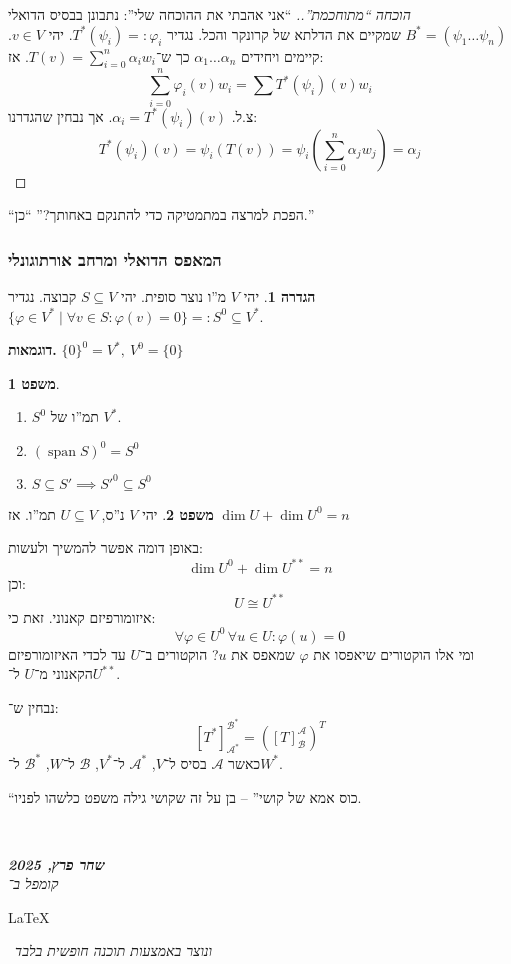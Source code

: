 \documentclass[a4paper]{article}
\newcommand\en[1] {\begin{otherlanguage}{english}#1\end{otherlanguage}}
\newcommand\ndoc  {\dotfill \\ \vfil {\begin{center}
			{\textbf{\textit{שחר פרץ, 2025}} \\
				\scriptsize \textit{קומפל ב־}\en{\LaTeX}\,\textit{ ונוצר באמצעות תוכנה חופשית בלבד}}
	\end{center}} \vfil	}
\newcommand\ac    {\mathcal{A}}
\newcommand\bc    {\mathcal{B}}
\newcommand\sumni     {\sum_{i = 0}^{n}}
\DeclareMathOperator{\Sp}      {span}
\newcommand\co        {\colon}
\newcommand\ag        {\alpha}
\newcommand\cl [1]    {\left ( #1 \right )}
\renewcommand\phi     {\varphi}
\theoremstyle{definition}
\newtheorem{Theorem}{\color{myblue}משפט}
\newtheorem{Definition}{\color{mygreen}הגדרה}
\newcommand\theo  [1] {\begin{Theorem}#1\end{Theorem}}
\newcommand\defi  [1] {\begin{Definition}#1\end{Definition}}
\begin{document}
	\begin{proof}[הוכחה ``מתוחכמת''.]
		``אני אהבתי את ההוכחה שלי'': נתבונן בבסיס הדואלי $B^* = (\psi_1 \dots \psi_n)$ שמקיים את הדלתא של קרונקר והכל. 
		נגדיר $T^*(\psi_i) =: \phi_i$. יהי $v \in V$. קיימים ויחידים $\ag_1 \dots \ag_n$ כך ש־$T(v) = \sumni \ag_i w_i$. אז: 
		\[ \sumni \phi_i(v)w_i = \sum T^*(\psi_i)(v) w_i \]
		צ.ל. $\ag_i = T^*(\psi_i)(v)$. אך נבחין שהגדרנו: 
		\[ T^*(\psi_i)(v) = \psi_i(T(v)) = \psi_i\cl{\sumni \ag_j w_j} = \ag_j \]
		
	\end{proof}
	
	``הפכת למרצה במתמטיקה כדי להתנקם באחותך?'' ``כן.''
	
	\subsubsection{המאפס הדואלי ומרחב אורתוגונלי}
	\defi{יהי $V$ מ''ו נוצר סופית. יהי $S \subseteq V$ קבוצה. נגדיר $\{\phi \in V^* \mid \forall v \in S \co \phi(v) = 0\} =: S^0 \subseteq V^*$. }
	
	\textbf{דוגמאות. } \hfil $\{0\}^0 = V^*, \ V^0 = \{0\}$
	
	\theo{\,
		\begin{enumerate}
			\item $S^0$ תמ''ו של $V^*$. 
			\item \hfil $(\Sp S)^0 = S^0$
			\item \hfil $S \subseteq S' \implies S'^0 \subseteq S^0$
	\end{enumerate}}
	
	\theo{יהי $V$ נ''ס, $U \subseteq V$ תמ''ו. אז $\dim U + \dim U^0 = n$}
	באופן דומה אפשר להמשיך ולעשות: 
	\[ \dim U^0 + \dim U^{**} = n \]
	וכן: 
	\[ U \cong U^{**} \]
	איזומורפיזם קאנוני. זאת כי:
	\[ \forall \phi \in U^0 \, \forall u \in U \co \phi(u) = 0 \]
	ומי אלו הוקטורים שיאפסו את $\phi$ שמאפס את $u$? הוקטורים ב־$U$ עד לכדי האיזומורפיזם הקאנוני מ־$U$ ל־$U^{**}$. 
	
	נבחין ש־: 
	\[ [T^*]^{\bc^*}_{\ac^*} = ([T]^{\ac}_{\bc})^T \]
	כאשר $\ac$ בסיס ל־$V$, $\ac^*$ ל־$V^*$, $\bc$ ל־$W$, $\bc^*$ ל־$W^*$. 
	
	``כוס אמא של קושי'' – בן על זה שקושי גילה משפט כלשהו לפניו. 
	
	\ndoc
	
	
	
	
	
\end{document}
